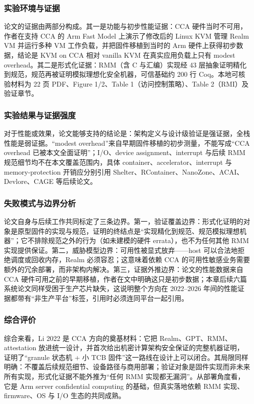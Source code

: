 \documentclass[11pt]{ctexart}
\begin{document}
\subsubsection{实验环境与证据}
论文的证据由两部分构成。其一是功能与初步性能证据：CCA 硬件当时不可用，作者在支持 CCA 的 Arm Fast Model 上演示了修改后的 Linux KVM 管理 Realm VM 并运行多种 VM 工作负载，并把固件移植到当时的 Arm 硬件上获得初步数据，结论是 KVM on CCA 相对 vanilla KVM 在真实应用负载上只有 modest overhead。其二是形式化证据：RMM（含 C 与汇编）实现经 43 层抽象证明精化到规范，规范再被证明模拟理想化安全机器，可信基础约 200 行 Coq。本地可核验材料为 22 页 PDF、Figure 1/2、Table 1（访问控制策略）、Table 2（RMI）及验证章节。\par
\subsubsection{实验结果与证据强度}
对于性能或效果，论文能够支持的结论是：架构定义与设计级验证是强证据，全栈性能是弱证据。“modest overhead”来自早期固件移植的初步测量，不能写成“CCA overhead 已被本文全面证明”；I/O、device assignment、interrupt 与后续 RMM 规范细节均不在本文覆盖范围内，具体 container、accelerator、interrupt 与 memory-protection 开销应分别引用 Shelter、RContainer、NanoZone、ACAI、Devlore、CAGE 等后续论文。\par
\subsubsection{失败模式与边界分析}
论文自身与后续工作共同标定了三条边界。第一，验证覆盖边界：形式化证明的对象是原型固件的实现与规范，证明的终结点是“实现精化到规范、规范模拟理想机器”；它不排除规范之外的行为（如未建模的硬件 errata），也不为任何其他 RMM 实现提供保证。第二，威胁模型边界：可用性被显式放弃——host 可以合法地拒绝调度或回收内存，Realm 必须容忍；这意味着依赖 CCA 的可用性敏感业务需要额外的冗余部署，而非架构内解决。第三，证据外推边界：论文的性能数据来自 CCA 硬件可用之前的早期移植，作者在文中明确这只是初步数据；本章后续六篇系统论文同样受困于生产芯片缺失，这说明整个方向在 2022--2026 年间的性能证据都带有“非生产平台”标签，引用时必须连同平台一起引用。\par
\subsubsection{综合评价}
综合来看，Li 2022 是 CCA 方向的奠基材料：它把 Realm、GPT、RMM、attestation 放进统一设计，并首次给出机密计算架构安全保证的完整机器证明，证明了“granule 状态机 + 小 TCB 固件”这一路线在设计上可以闭合。其局限同样明确：不覆盖后续规范细节、设备路径与商用部署；验证对象是固件实现而非未来所有实现，形式化证据不能外推为“任何 RMM 实现都无漏洞”。从部署角度看，它是 Arm server confidential computing 的基础，但真实落地依赖 RMM 实现、firmware、OS 与 I/O 生态的共同成熟。\par
\end{document}
